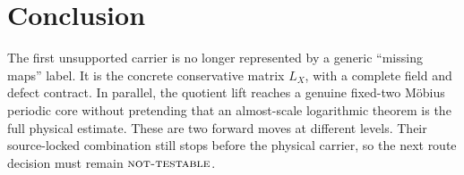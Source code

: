 \documentclass[11pt]{article}
\theoremstyle{definition}
\theoremstyle{remark}
\newcommand{\NT}{\textnormal{\textsc{not-testable}}}
\begin{document}
\section{Conclusion}

The first unsupported carrier is no longer represented by a generic
``missing maps'' label.  It is the concrete conservative matrix
\(L_X\), with a complete field and defect contract.  In parallel, the
quotient lift reaches a genuine fixed-two M\"obius periodic core
without pretending that an almost-scale logarithmic theorem is the
full physical estimate.  These are two forward moves at different
levels.  Their source-locked combination still stops before the
physical carrier, so the next route decision must remain
\(\NT\).



\end{document}
